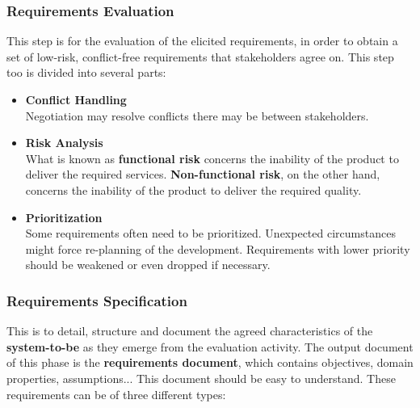 \documentclass{article}
\begin{document}
\subsubsection{Requirements Evaluation}
This step is for the evaluation of the elicited requirements, in order to obtain a set of low-risk, conflict-free requirements that stakeholders agree on. This step too is divided into several parts:

\begin{itemize}
	\item \textbf{Conflict Handling}
	\vspace{.2cm} \\
	Negotiation may resolve conflicts there may be between stakeholders.
	
	\item \textbf{Risk Analysis}
	\vspace{.2cm} \\
	What is known as \textbf{functional risk} concerns the inability of the product to deliver the required services. \textbf{Non-functional risk}, on the other hand, concerns the inability of the product to deliver the required quality.
	
	\item \textbf{Prioritization}
	\vspace{.2cm} \\
	Some requirements often need to be prioritized. Unexpected circumstances might force re-planning of the development. Requirements with lower priority should be weakened or even dropped if necessary.
\end{itemize}

\subsubsection{Requirements Specification}
This is to detail, structure and document the agreed characteristics of the \textbf{system-to-be} as they emerge from the evaluation activity. The output document of this phase is the \textbf{requirements document}, which contains objectives, domain properties, assumptions... This document should be easy to understand. These requirements can be of three different types:
\end{document}
